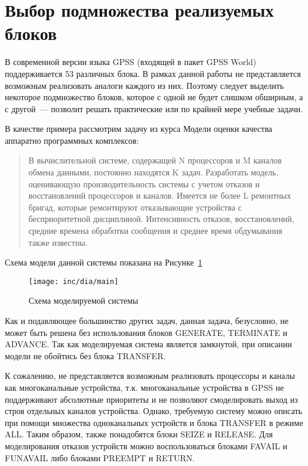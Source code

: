 \section{Выбор подмножества реализуемых блоков}

В современной версии языка GPSS (входящей в пакет GPSS World) поддерживается 53 различных блока.\cite{GPSSRef} В рамках данной работы не представляется возможным реализовать  аналоги каждого из них. Поэтому следует выделить некоторое подмножество блоков, которое с одной не будет слишком обширным, а с другой~--- позволит решать практические или по крайней мере учебные задачи.

В качестве примера рассмотрим задачу из курса Модели оценки качества аппаратно программных комплексов:

\begin{quote}
В вычислительной системе, содержащей N процессоров и M каналов обмена данными, постоянно находятся K задач. Разработать модель, оценивающую производительность системы с учетом отказов и восстановлений процессоров и каналов. Имеется не более L ремонтных бригад, которые ремонтируют отказывающие устройства с бесприоритетной  дисциплиной. Интенсивность отказов, восстановлений, средние времена обработки сообщения и среднее время обдумывания также известны.
\end{quote}

Схема модели данной системы показана на Рисунке~\ref{fig:mainModel}

\begin{figure}[ht]
\centering
\texttt{[image: inc/dia/main]}
\caption{Схема моделируемой системы}
\label{fig:mainModel}
\end{figure}

Как и подавляющее большинство других задач, данная задача, безусловно, не может быть решена без использования блоков GENERATE, TERMINATE и ADVANCE. Так как моделируемая система является замкнутой, при описании модели не обойтись без блока TRANSFER.

К сожалению, не представляется возможным реализовать процессоры и каналы как многоканальные устройства, т.к. многоканальные устройства в GPSS не поддерживают абсолютные приоритеты и не позволяют смоделировать выход из строя отдельных каналов устройства. Однако, требуемую систему можно описать при помощи множества одноканальных устройств и блока TRANSFER в режиме ALL. Таким образом, также понадобятся блоки SEIZE и RELEASE. Для моделирования отказов устройств можно воспользоваться блоками FAVAIL и FUNAVAIL либо блоками PREEMPT и RETURN.


